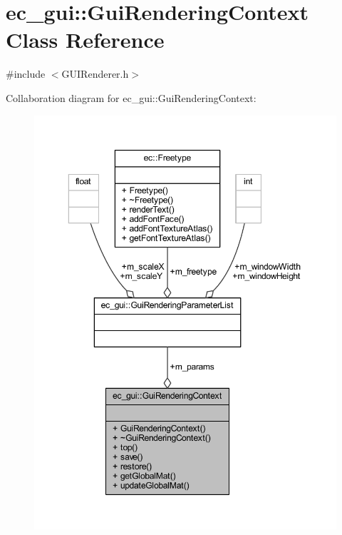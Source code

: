 \hypertarget{classec__gui_1_1_gui_rendering_context}{}\section{ec\+\_\+gui\+:\+:Gui\+Rendering\+Context Class Reference}
\label{classec__gui_1_1_gui_rendering_context}


{\ttfamily \#include $<$G\+U\+I\+Renderer.\+h$>$}



Collaboration diagram for ec\+\_\+gui\+:\+:Gui\+Rendering\+Context\+:\nopagebreak
\begin{figure}[H]
\begin{center}
\leavevmode
\includegraphics[width=350pt]{classec__gui_1_1_gui_rendering_context__coll__graph}
\end{center}
\end{figure}
